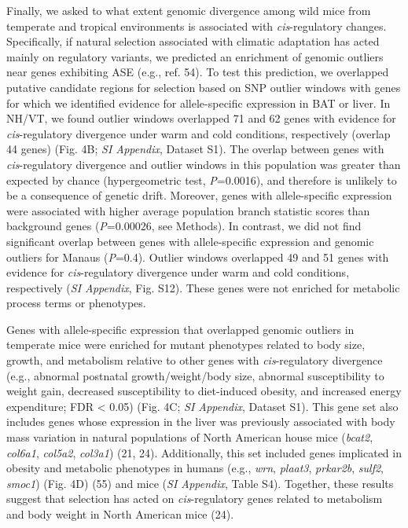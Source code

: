 \documentclass[9pt,twocolumn,twoside,lineno]{pnas-new}
\begin{document}
Finally, we asked to what extent genomic divergence among wild mice from
temperate and tropical environments is associated with
\emph{cis}-regulatory changes. Specifically, if natural selection
associated with climatic adaptation has acted mainly on regulatory
variants, we predicted an enrichment of genomic outliers near genes
exhibiting ASE (e.g., ref. 54). To test this prediction, we overlapped
putative candidate regions for selection based on SNP outlier windows
with genes for which we identified evidence for allele-specific
expression in BAT or liver. In NH/VT, we found outlier windows
overlapped 71 and 62 genes with evidence for \emph{cis}-regulatory
divergence under warm and cold conditions, respectively (overlap 44
genes) (Fig. 4B; \emph{SI Appendix}, Dataset S1). The overlap between
genes with \emph{cis}-regulatory divergence and outlier windows in this
population was greater than expected by chance (hypergeometric test,
\emph{P}=0.0016), and therefore is unlikely to be a consequence of
genetic drift. Moreover, genes with allele-specific expression were
associated with higher average population branch statistic scores than
background genes (\emph{P}=0.00026, see Methods). In contrast, we did
not find significant overlap between genes with allele-specific
expression and genomic outliers for Manaus (\emph{P}=0.4). Outlier
windows overlapped 49 and 51 genes with evidence for
\emph{cis}-regulatory divergence under warm and cold conditions,
respectively (\emph{SI Appendix}, Fig. S12). These genes were not
enriched for metabolic process terms or phenotypes.

Genes with allele-specific expression that overlapped genomic outliers
in temperate mice were enriched for mutant phenotypes related to body
size, growth, and metabolism relative to other genes with
\emph{cis}-regulatory divergence (e.g., abnormal postnatal
growth/weight/body size, abnormal susceptibility to weight gain,
decreased susceptibility to diet-induced obesity, and increased energy
expenditure; FDR \textless{} 0.05) (Fig. 4C; \emph{SI Appendix}, Dataset
S1). This gene set also includes genes whose expression in the liver was
previously associated with body mass variation in natural populations of
North American house mice (\emph{bcat2}, \emph{col6a1}, \emph{col5a2},
\emph{col3a1}) (21, 24). Additionally, this set included genes
implicated in obesity and metabolic phenotypes in humans (e.g.,
\emph{wrn}, \emph{plaat3}, \emph{prkar2b}, \emph{sulf2}, \emph{smoc1})
(Fig. 4D) (55) and mice (\emph{SI Appendix}, Table S4). Together, these
results suggest that selection has acted on \emph{cis}-regulatory genes
related to metabolism and body weight in North American mice (24).
\end{document}
